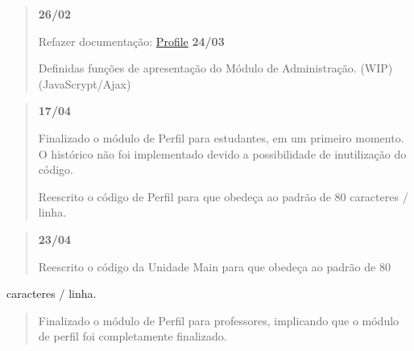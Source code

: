 \begin{quotation}
{\bfseries 26/02}
\begin{DoxyItemize}
\item Refazer documentação\-: \hyperlink{namespaceProfile}{Profile} {\bfseries 24/03}
\item Definidas funções de apresentação do Módulo de Administração. (W\-I\-P) (Java\-Scrypt/\-Ajax)
\item 
\end{DoxyItemize}\end{quotation}


\begin{quotation}
{\bfseries 17/04}
\begin{DoxyItemize}
\item Finalizado o módulo de Perfil para estudantes, em um primeiro momento. O histórico não foi implementado devido a possibilidade de inutilização do código.
\item Reescrito o código de Perfil para que obedeça ao padrão de 80 caracteres / linha.
\end{DoxyItemize}

\end{quotation}


\begin{quotation}
{\bfseries 23/04}
\begin{DoxyItemize}
\item Reescrito o código da Unidade Main para que obedeça ao padrão de 80
\end{DoxyItemize}

\end{quotation}
caracteres / linha. \begin{quotation}

\begin{DoxyItemize}
\item Finalizado o módulo de Perfil para professores, implicando que o módulo de perfil foi completamente finalizado. 
\end{DoxyItemize}\end{quotation}
